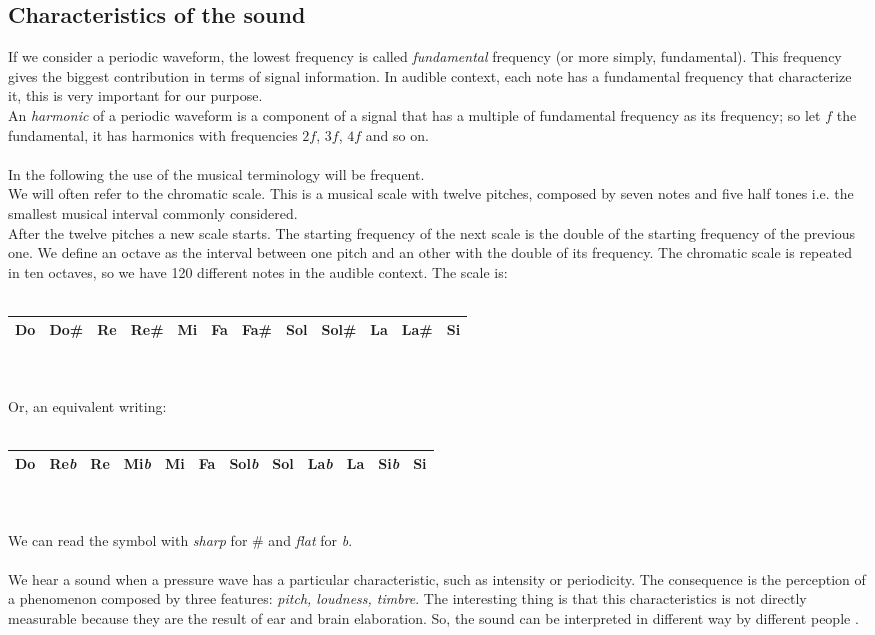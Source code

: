 \subsection{Characteristics of the sound}
If we consider a periodic waveform, the lowest frequency is called \textit{fundamental} frequency (or more simply, fundamental). This frequency gives the biggest contribution in terms of signal information. 
In audible context, each note has a fundamental frequency that characterize it, this is very important for our purpose.\\
An \textit{harmonic} of a periodic waveform is a component of a signal that has a multiple of fundamental frequency as its frequency; so let $f$ the fundamental, it has harmonics  with frequencies $2f$, $3f$, $4f$ and so on.\\\\
In the following the use of the musical terminology will be frequent.\\
We will often refer to the chromatic scale. This is a musical scale with twelve pitches, composed by seven notes and five half tones i.e. the smallest musical interval commonly considered.\\ 
After the twelve pitches a new scale starts. The starting frequency of the next scale is the double of the starting frequency of the previous one. We define an octave as the interval between one pitch and an other with the double of its frequency. The chromatic scale is repeated in ten octaves, so we have 120 different notes in the audible context. The scale is:\\\\
\begin{tabular}{|c|c|c|c|c|c|c|c|c|c|c|c|}
\hline 
Do & Do\# & Re & Re\# & Mi & Fa & Fa\# & Sol & Sol\# & La & La\# & Si\\
\hline 
\end{tabular}\\\\ 
Or, an equivalent writing:\\\\
\begin{tabular}{|c|c|c|c|c|c|c|c|c|c|c|c|}
\hline 
Do & Re\textit{b} & Re & Mi\textit{b} & Mi & Fa & Sol\textit{b} & Sol & La\textit{b} & La & Si\textit{b} & Si\\
\hline 
\end{tabular}\\\\
We can read the symbol with \textit{sharp} for \# and \textit{flat} for \textit{b}.\\\\
We hear a sound when a pressure wave has a particular characteristic, such as intensity or periodicity. The consequence is the perception of a phenomenon composed by three features: \textit{pitch, loudness, timbre}. The interesting thing is that this characteristics is not directly measurable because they are the result of ear and brain elaboration. So, the sound can be interpreted in different way by different people \cite{soundanalysis}.


